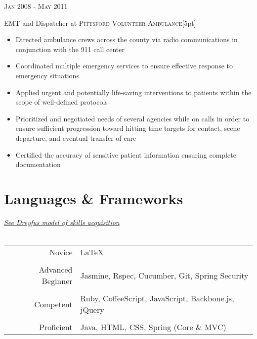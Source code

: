 \documentclass[10pt]{article} %
\begin{document}
{\begin{minipage}[t]{0.5\textwidth}

{\raggedleft\textsc{Jan 2008 - May 2011}\par}

{\raggedright\large EMT and Dispatcher at \textsc{Pittsford Volunteer Ambulance}[5pt]}
\begin{itemize}
  \item Directed ambulance crews across the county via radio communications in conjunction with the 911 call center
  \item Coordinated multiple emergency services to ensure effective response to emergency situations
  \item Applied urgent and potentially life-saving interventions to patients within the scope of well-defined protocols
  \item Prioritized and negotiated needs of several agencies while on calls in order to ensure sufficient progression toward hitting time targets for contact, scene departure, and eventual transfer of care
  \item Certified the accuracy of sensitive patient information ensuring complete documentation
\end{itemize}


\section{Languages \& Frameworks } 

{\scriptsize \href{http://en.wikipedia.org/wiki/Dreyfus_model_of_skill_acquisition}{\textit{See Dreyfus model of skills acquisition}}} \\ \\
\begin{tabular}{rl}
Novice
& \LaTeX \\ 
\\
Advanced Beginner
& {Jasmine, Rspec, Cucumber, Git, Spring Security} \\
\\
Competent
& Ruby, CoffeeScript, JavaScript, Backbone.js, jQuery \\
\\
Proficient
& Java, HTML, CSS, Spring (Core \& MVC) \\
\end{tabular}\\[10pt]



\end{minipage}}
\end{document}

